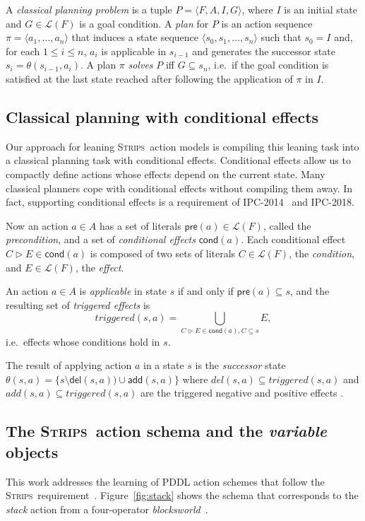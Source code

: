 \documentclass[letterpaper]{article} %
\newcommand{\tup}[1]{{\langle #1 \rangle}}
\newcommand{\pre}{\mathsf{pre}}     %
\newcommand{\del}{\mathsf{del}}     %
\newcommand{\add}{\mathsf{add}}     %
\newcommand{\cond}{\mathsf{cond}}   %
\newcommand{\strips}{\textsc{Strips}}     %
\begin{document}
A {\em classical planning problem} is a tuple $P=\tup{F,A,I,G}$, where $I$ is an initial state and $G\in\mathcal{L}(F)$ is a goal condition. A {\em plan} for $P$ is an action sequence $\pi=\tup{a_1, \ldots, a_n}$ that induces a state sequence $\tup{s_0, s_1, \ldots, s_n}$ such that $s_0=I$ and, for each {\small $1\leq i\leq n$}, $a_i$ is applicable in $s_{i-1}$ and generates the successor state $s_i=\theta(s_{i-1},a_i)$. A plan $\pi$ {\em solves} $P$ iff $G\subseteq s_n$, i.e.~if the goal condition is satisfied at the last state reached after following the application of $\pi$ in $I$.


\subsection{Classical planning with conditional effects}
Our approach for leaning \strips\ action models is compiling this leaning task into a classical planning task with conditional effects. Conditional effects allow us to compactly define actions whose effects depend on the current state. Many classical planners cope with conditional effects without compiling them away. In fact, supporting conditional effects is a requirement of IPC-2014~\cite{vallati:IPC:AIM2015} and IPC-2018.

Now an action $a\in A$ has a set of literals $\pre(a)\in\mathcal{L}(F)$, called the {\em precondition}, and a set of {\em conditional effects} $\cond(a)$. Each conditional effect $C\rhd E\in\cond(a)$ is composed of two sets of literals $C\in\mathcal{L}(F)$, the {\em condition}, and $E\in\mathcal{L}(F)$, the {\em effect}.

An action $a\in A$ is {\em applicable} in state $s$ if and only if $\pre(a)\subseteq s$, and the resulting set of {\em triggered effects} is
\[
triggered(s,a)=\bigcup_{C\rhd E\in\cond(a),C\subseteq s} E,
\]
i.e.~effects whose conditions hold in $s$.

The result of applying action $a$ in a state $s$ is the {\em successor} state $\theta(s,a)=\{s\setminus\del(s,a))\cup\add(s,a)\}$ where $del(s,a)\subseteq triggered(s,a)$ and $add(s,a)\subseteq triggered(s,a)$ are the triggered negative and positive effects .


\subsection{The \strips\ action schema and the {\em variable} objects}
This work addresses the learning of PDDL action schemes that follow the \strips\ requirement~\cite{mcdermott1998pddl,fox2003pddl2}. Figure~\ref{fig:stack} shows the schema that corresponds to the {\em stack} action from a four-operator {\em blocksworld}~\cite{slaney2001blocks}.
\end{document}
